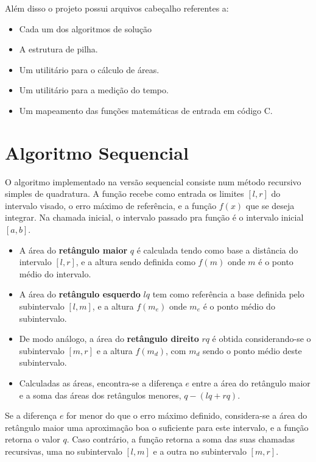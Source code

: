 \documentclass[11pt]{article}
\begin{document}
Além disso o projeto possui arquivos cabeçalho referentes a:
\begin{itemize}
\item Cada um dos algoritmos de solução
\item A estrutura de pilha.
\item Um utilitário para o cálculo de áreas.
\item Um utilitário para a medição do tempo.
\item Um mapeamento das funções matemáticas de entrada em código C.
\end{itemize}

\section{Algoritmo Sequencial}
\label{sec:org8709751}
O algoritmo implementado na versão sequencial consiste num método recursivo simples de quadratura.
A função recebe como entrada os limites \([l, r]\) do intervalo visado,
o erro máximo de referência, e a função \(f(x)\) que se deseja integrar.
Na chamada inicial, o intervalo passado pra função é o intervalo inicial \([a, b]\).

\begin{itemize}
\item A área do \textbf{retângulo maior} \(q\) é calculada tendo como base a distância do intervalo \([l, r]\),
e a altura sendo definida como \(f(m)\) onde \(m\) é o ponto médio do intervalo.
\item A área do \textbf{retângulo esquerdo} \(lq\) tem como referência a base definida pelo subintervalo \([l, m]\),
e a altura \(f(m_{e})\) onde \(m_{e}\) é o ponto médio do subintervalo.
\item De modo análogo, a área do \textbf{retângulo direito} \(rq\) é obtida considerando-se o subintervalo \([m, r]\)
e a altura \(f(m_{d})\), com \(m_{d}\) sendo o ponto médio deste subintervalo.
\item Calculadas as áreas, encontra-se a diferença \(e\) entre a área do retângulo maior e a soma
das áreas dos retângulos menores, \(q - (lq + rq)\).
\end{itemize}

Se a diferença \(e\) for menor do que o erro máximo definido, considera-se a área do retângulo
maior uma aproximação boa o suficiente para este intervalo, e a função retorna o valor \(q\).
Caso contrário, a função retorna a soma das suas chamadas recursivas, uma no subintervalo
\([l, m]\) e a outra no subintervalo \([m, r]\).
\end{document}
